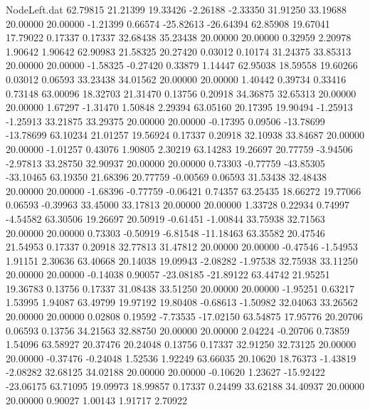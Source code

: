 \begin{filecontents}{NodeLeft.dat}
  62.79815   21.21399   19.33426    -2.26188   -2.33350   31.91250   33.19688   20.00000   20.00000   -1.21399    0.66574  -25.82613  -26.64394
  62.85908   19.67041   17.79022     0.17337    0.17337   32.68438   35.23438   20.00000   20.00000    0.32959    2.20978    1.90642    1.90642
  62.90983   21.58325   20.27420     0.03012    0.10174   31.24375   33.85313   20.00000   20.00000   -1.58325   -0.27420    0.33879    1.14447
  62.95038   18.59558   19.60266     0.03012    0.06593   33.23438   34.01562   20.00000   20.00000    1.40442    0.39734    0.33416    0.73148
  63.00096   18.32703   21.31470     0.13756    0.20918   34.36875   32.65313   20.00000   20.00000    1.67297   -1.31470    1.50848    2.29394
  63.05160   20.17395   19.90494    -1.25913   -1.25913   33.21875   33.29375   20.00000   20.00000   -0.17395    0.09506  -13.78699  -13.78699
  63.10234   21.01257   19.56924     0.17337    0.20918   32.10938   33.84687   20.00000   20.00000   -1.01257    0.43076    1.90805    2.30219
  63.14283   19.26697   20.77759    -3.94506   -2.97813   33.28750   32.90937   20.00000   20.00000    0.73303   -0.77759  -43.85305  -33.10465
  63.19350   21.68396   20.77759    -0.00569    0.06593   31.53438   32.48438   20.00000   20.00000   -1.68396   -0.77759   -0.06421    0.74357
  63.25435   18.66272   19.77066     0.06593   -0.39963   33.45000   33.17813   20.00000   20.00000    1.33728    0.22934    0.74997   -4.54582
  63.30506   19.26697   20.50919    -0.61451   -1.00844   33.75938   32.71563   20.00000   20.00000    0.73303   -0.50919   -6.81548  -11.18463
  63.35582   20.47546   21.54953     0.17337    0.20918   32.77813   31.47812   20.00000   20.00000   -0.47546   -1.54953    1.91151    2.30636
  63.40668   20.14038   19.09943    -2.08282   -1.97538   32.75938   33.11250   20.00000   20.00000   -0.14038    0.90057  -23.08185  -21.89122
  63.44742   21.95251   19.36783     0.13756    0.17337   31.08438   33.51250   20.00000   20.00000   -1.95251    0.63217    1.53995    1.94087
  63.49799   19.97192   19.80408    -0.68613   -1.50982   32.04063   33.26562   20.00000   20.00000    0.02808    0.19592   -7.73535  -17.02150
  63.54875   17.95776   20.20706     0.06593    0.13756   34.21563   32.88750   20.00000   20.00000    2.04224   -0.20706    0.73859    1.54096
  63.58927   20.37476   20.24048     0.13756    0.17337   32.91250   32.73125   20.00000   20.00000   -0.37476   -0.24048    1.52536    1.92249
  63.66035   20.10620   18.76373    -1.43819   -2.08282   32.68125   34.02188   20.00000   20.00000   -0.10620    1.23627  -15.92422  -23.06175
  63.71095   19.09973   18.99857     0.17337    0.24499   33.62188   34.40937   20.00000   20.00000    0.90027    1.00143    1.91717    2.70922

\end{filecontents}

